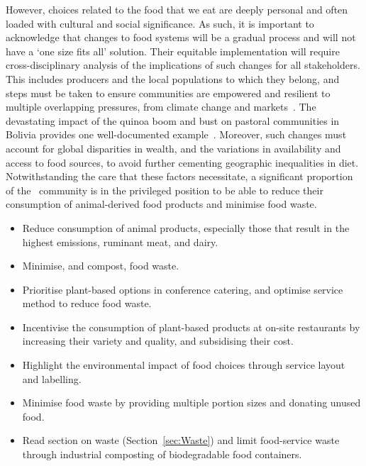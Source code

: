 \documentclass[../SustainableHEP.tex]{subfiles}
\begin{document}
 However, choices related to the food that we eat are deeply personal and often loaded with cultural and social significance. As such, it is important to acknowledge that changes to food systems will be a gradual process and will not have a `one size fits all' solution. Their equitable implementation will require cross-disciplinary analysis of the implications of such changes for all stakeholders. This includes producers and the local populations to which they belong, and steps must be taken to ensure communities are empowered and resilient to multiple overlapping pressures, from climate change and markets~\cite{WalshDilley2020}. The devastating impact of the quinoa boom and bust on pastoral communities in Bolivia provides one well-documented example~\cite{WalshDilley2020, Rodas2021}. Moreover, such changes must account for global disparities in wealth, and the variations in availability and access to food sources, to avoid further cementing geographic inequalities in diet. Notwithstanding the care that these factors necessitate, a significant proportion of the \ACR\ community is in the privileged position to be able to reduce their consumption of animal-derived food products and minimise food waste.


\newpage
\begin{reco2}{\currentname}
{
\begin{itemize}[leftmargin=6 mm]
\item Reduce consumption of animal products, especially those that result in the highest emissions, \eg ruminant meat, and dairy.

\item Minimise, and compost, food waste.
\end{itemize}
}
{
\begin{itemize}[leftmargin=6 mm]
\item Prioritise plant-based options in conference catering, and optimise service method to reduce food waste.
\end{itemize}
}
{
\begin{itemize}[leftmargin=6 mm]
\item Incentivise the consumption of plant-based products at on-site restaurants by increasing their variety and quality,  and subsidising their cost.

\item Highlight the environmental impact of food choices through service layout and labelling.

\item Minimise food waste by providing multiple portion sizes and donating unused food.

\item Read section on waste (Section~\ref{sec:Waste}) and limit food-service waste \eg through industrial composting of biodegradable food containers.
\end{itemize}}
\end{reco2}
\end{document}
